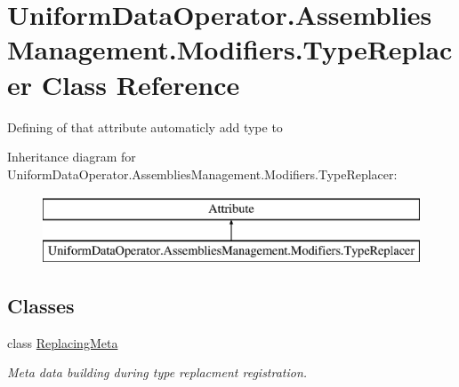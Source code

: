\hypertarget{class_uniform_data_operator_1_1_assemblies_management_1_1_modifiers_1_1_type_replacer}{}\section{Uniform\+Data\+Operator.\+Assemblies\+Management.\+Modifiers.\+Type\+Replacer Class Reference}
\label{class_uniform_data_operator_1_1_assemblies_management_1_1_modifiers_1_1_type_replacer}


Defining of that attribute automaticly add type to  


Inheritance diagram for Uniform\+Data\+Operator.\+Assemblies\+Management.\+Modifiers.\+Type\+Replacer\+:\begin{figure}[H]
\begin{center}
\leavevmode
\includegraphics[height=2.000000cm]{d8/d6c/class_uniform_data_operator_1_1_assemblies_management_1_1_modifiers_1_1_type_replacer}
\end{center}
\end{figure}
\subsection*{Classes}
\begin{DoxyCompactItemize}
\item 
class \mbox{\hyperlink{class_uniform_data_operator_1_1_assemblies_management_1_1_modifiers_1_1_type_replacer_1_1_replacing_meta}{Replacing\+Meta}}
\begin{DoxyCompactList}\small\item\em Meta data building during type replacment registration. \end{DoxyCompactList}\end{DoxyCompactItemize}
